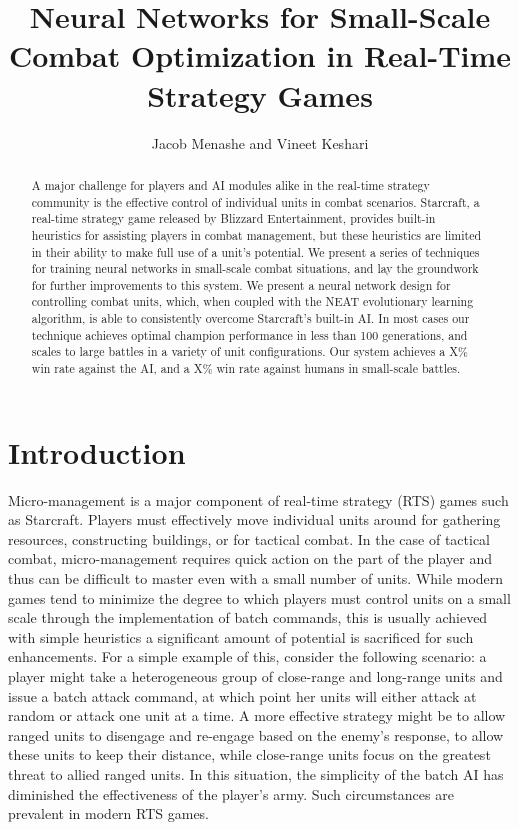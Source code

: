 \documentclass[a4paper]{article}
\newcommand{\fillin}[1]{X}
\begin{document}
\title{Neural Networks for Small-Scale Combat Optimization in Real-Time Strategy Games}
\author{Jacob Menashe and Vineet Keshari}
\maketitle

\begin{abstract}
A major challenge for players and AI modules alike in the real-time strategy community is the effective control of individual units in combat scenarios. Starcraft, a real-time strategy game released by Blizzard Entertainment, provides built-in heuristics for assisting players in combat management, but these heuristics are limited in their ability to make full use of a unit's potential. We present a series of techniques for training neural networks in small-scale combat situations, and lay the groundwork for further improvements to this system. We present a neural network design for controlling combat units, which, when coupled with the NEAT evolutionary learning algorithm, is able to consistently overcome Starcraft's built-in AI. In most cases our technique achieves optimal champion performance in less than 100 generations, and scales to large battles in a variety of unit configurations. Our system achieves a \fillin{pct games against AI, final}\% win rate against the AI, and a \fillin{pct games against humans}\% win rate against humans in small-scale battles.
\end{abstract}

\section{Introduction}

Micro-management is a major component of real-time strategy (RTS) games such as Starcraft. Players must effectively move individual units around for gathering resources, constructing buildings, or for tactical combat. In the case of tactical combat, micro-management requires quick action on the part of the player and thus can be difficult to master even with a small number of units. While modern games tend to minimize the degree to which players must control units on a small scale through the implementation of batch commands, this is usually achieved with simple heuristics a significant amount of potential is sacrificed for such enhancements. For a simple example of this, consider the following scenario: a player might take a heterogeneous group of close-range and long-range units and issue a batch attack command, at which point her units will either attack at random or attack one unit at a time. A more effective strategy might be to allow ranged units to disengage and re-engage based on the enemy's response, to allow these units to keep their distance, while close-range units focus on the greatest threat to allied ranged units. In this situation, the simplicity of the batch AI has diminished the effectiveness of the player's army. Such circumstances are prevalent in modern RTS games.
\end{document}
